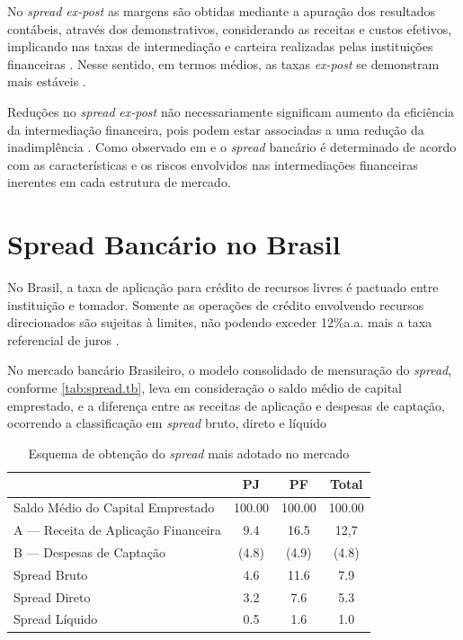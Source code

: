 \documentclass[12pt,openright,oneside,a4paper,chapter=TITLE,section=TITLE,subsection=Title,english,french,spanish,portugues,sumario=tradicional]{04-class-files/abntex2}
\begin{document}
No \emph{spread ex-post} as margens são obtidas mediante a apuração dos resultados
contábeis, através dos demonstrativos, considerando as receitas e custos
efetivos, implicando nas taxas de intermediação e carteira realizadas pelas
instituições financeiras \cite{kunt:1999, durigan:2018}. Nesse sentido, em
termos médios, as taxas \emph{ex-post} se demonstram mais estáveis \cite{leal:2006, dantas:2012}.

Reduções no \emph{spread} \emph{ex-post} não necessariamente significam aumento da
eficiência da intermediação financeira, pois podem estar associadas a uma
redução da inadimplência \cite{kunt:1999}. Como observado em
\textcite{klein:1971} e \textcite{ho-saunders:1981} o \emph{spread} bancário é
determinado de acordo com as características e os riscos envolvidos nas
intermediações financeiras inerentes em cada estrutura de mercado.

\section{Spread Bancário no Brasil}

No Brasil, a taxa de aplicação para crédito de recursos livres é pactuado entre
instituição e tomador. Somente as operações de crédito envolvendo recursos
direcionados são sujeitas à limites, não podendo exceder 12\%a.a. mais a taxa
referencial de juros \cite{BCB:2016}.

No mercado bancário Brasileiro, o modelo consolidado de mensuração do \emph{spread},
conforme \autoref{tab:spread.tb}, leva em consideração o saldo médio de capital
emprestado, e a diferença entre as receitas de aplicação e despesas de
captação, ocorrendo a classificação em \emph{spread} bruto, direto e líquido
\cite{fipecafi:2005}

\begin{table}[b]
 \centering
   \caption{Esquema de obtenção do \emph{spread} mais adotado no mercado} 
    \label{tab:spread.tb}
     \begin{tabular}{l|c|c|c}
      \hline
                                           &   PJ   &   PF    & Total \\
       \hline
       Saldo Médio do Capital Emprestado   & 100.00 & 100.00  & 100.00 \\
       A — Receita de Aplicação Financeira & 9.4    & 16.5    & 12,7   \\
       B — Despesas de Captação            & (4.8)  & (4.9)   & (4.8)  \\   
       Spread Bruto                        & 4.6    & 11.6    & 7.9    \\
       Spread Direto                       & 3.2    & 7.6     & 5.3    \\
       Spread Líquido                      & 0.5    & 1.6     & 1.0    \\
       \hline
       \end{tabular}
\end{table}
\end{document}
